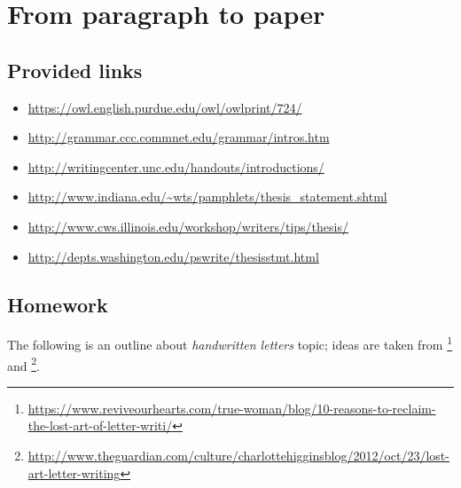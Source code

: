 

\chapter{From paragraph to paper}

\section{Provided links}

\begin{itemize}
    \item \url{https://owl.english.purdue.edu/owl/owlprint/724/}
    \item \url{http://grammar.ccc.commnet.edu/grammar/intros.htm}
    \item \url{http://writingcenter.unc.edu/handouts/introductions/}
    \item \url{http://www.indiana.edu/~wts/pamphlets/thesis_statement.shtml}
    \item \url{http://www.cws.illinois.edu/workshop/writers/tips/thesis/}
    \item \url{http://depts.washington.edu/pswrite/thesisstmt.html}
\end{itemize}

\section{Homework}

The following is an outline about \emph{handwritten letters} topic; ideas are taken from 
\footnote{\url{https://www.reviveourhearts.com/true-woman/blog/10-reasons-to-reclaim-the-lost-art-of-letter-writi/}}
and \footnote{\url{http://www.theguardian.com/culture/charlottehigginsblog/2012/oct/23/lost-art-letter-writing}}.


